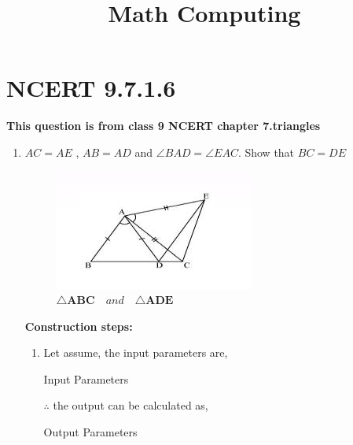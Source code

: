 \documentclass[11pt, a4paper]{article}
\title{ \textbf{Math Computing}}
\date{}
\let\vec\mathbf
\begin{document}
\vspace{-\baselineskip}
\maketitle

\section*{NCERT 9.7.1.6}

\textbf{This question is from class 9 NCERT chapter 7.triangles}
\begin{enumerate}
\item $AC = AE$ , $AB = AD$ and $\angle BAD = \angle EAC$. Show that $BC = DE$
	
\begin{figure}[H]
    \includegraphics[width=\columnwidth]{figs/ABCDE.png}
	\caption{$\triangle  \vec{ABC} \hspace{12pt} and \hspace{12pt} \triangle \vec{ADE}$}
 \label{fig:fig1}
\end{figure}
\pagebreak
\textbf{Construction steps:}
\\
		\begin{enumerate}[label=(\roman*)]

\item Let assume, the input parameters are, 
\begin{table}[H]
\centering
	
	  \caption{Input Parameters}
	  \label{Table-1: }
\end{table}

$\therefore$ the output can be calculated as,
\begin{table}[H]
\centering
	
	  \caption{Output Parameters}
	  \label{Table-2: }
\end{table}


\end{enumerate}
\end{enumerate}
\end{document}

